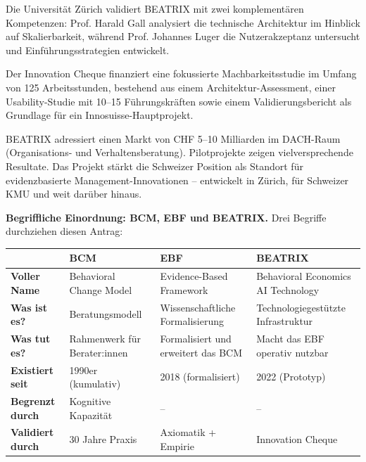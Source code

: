 \documentclass[11pt,a4paper]{article}
\begin{document}
Die Universität Zürich validiert BEATRIX mit zwei komplementären Kompetenzen: Prof. Harald Gall analysiert die technische Architektur im Hinblick auf Skalierbarkeit, während Prof. Johannes Luger die Nutzerakzeptanz untersucht und Einführungsstrategien entwickelt.

Der Innovation Cheque finanziert eine fokussierte Machbarkeitsstudie im Umfang von 125 Arbeitsstunden, bestehend aus einem Architektur-Assessment, einer Usability-Studie mit 10--15 Führungskräften sowie einem Validierungsbericht als Grundlage für ein Innosuisse-Hauptprojekt.

BEATRIX adressiert einen Markt von CHF 5--10 Milliarden im DACH-Raum (Organisations- und Verhaltensberatung). Pilotprojekte zeigen vielversprechende Resultate. Das Projekt stärkt die Schweizer Position als Standort für evidenzbasierte Management-Innovationen -- entwickelt in Zürich, für Schweizer KMU und weit darüber hinaus.

\vspace{0.5cm}
\noindent\textbf{Begriffliche Einordnung: BCM, EBF und BEATRIX.} Drei Begriffe durchziehen diesen Antrag:

\begin{table}[h]
\centering
\begin{tabular}{@{}L{2.2cm}L{3.8cm}L{3.5cm}L{3.5cm}@{}}
\toprule
& \textbf{BCM} & \textbf{EBF} & \textbf{BEATRIX} \\
\midrule
\textbf{Voller Name} & Behavioral Change Model & Evidence-Based Framework & Behavioral Economics AI Technology \\
\textbf{Was ist es?} & Beratungsmodell & Wissenschaftliche Formalisierung & Technologiegestützte Infrastruktur \\
\textbf{Was tut es?} & Rahmenwerk für Berater:innen & Formalisiert und erweitert das BCM & Macht das EBF operativ nutzbar \\
\textbf{Existiert seit} & 1990er (kumulativ) & 2018 (formalisiert) & 2022 (Prototyp) \\
\textbf{Begrenzt durch} & Kognitive Kapazität & -- & -- \\
\textbf{Validiert durch} & 30 Jahre Praxis & Axiomatik + Empirie & Innovation Cheque \\
\bottomrule
\end{tabular}
\end{table}
\end{document}
